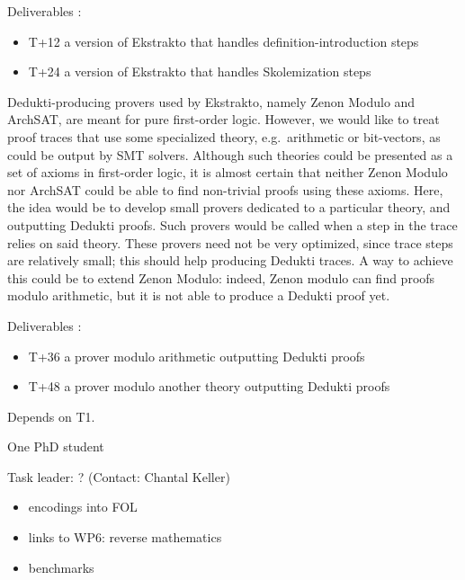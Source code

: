 \begin{workpackage}[id=atpetc,wphases=0-48,type=RTD,
  short=ATPs etc.,%
  title={ATP, SAT, SMT, Model checkers},
  lead=Lie,
  LieRM=10]
\begin{tasklist}
\begin{task}[id=tracetodedukti, title=Translate ATP traces into Dedukti]
\begin{compactenum}
  Deliverables :
  \begin{itemize}
  \item T+12 a version of Ekstrakto that handles definition-introduction steps
  \item T+24 a version of Ekstrakto that handles Skolemization steps
  \end{itemize}



\item  Dedukti-producing provers used by Ekstrakto, namely Zenon Modulo and
  ArchSAT, are meant for pure first-order logic. However, we would like
  to treat proof traces that use some specialized theory,
  e.g.\ arithmetic or bit-vectors, as could be output by SMT
  solvers. Although such theories could be presented as a set of axioms
  in first-order logic, it is almost certain that neither Zenon Modulo
  nor ArchSAT could be able to find non-trivial proofs using these
  axioms. Here, the idea would be to develop small provers dedicated to
  a particular theory, and outputting Dedukti proofs. Such provers would
  be called when a step in the trace relies on said theory. These
  provers need not be very optimized, since trace steps are relatively
  small; this should help producing Dedukti traces. A way to achieve
  this could be to extend Zenon Modulo: indeed, Zenon modulo can find
  proofs modulo arithmetic, but it is not able to produce a Dedukti
  proof yet.

  Deliverables :
  \begin{itemize}
  \item T+36 a prover modulo arithmetic outputting Dedukti proofs
  \item T+48 a prover modulo another theory outputting Dedukti proofs
  \end{itemize}

\end{compactenum}
  Depends on T1.

  One PhD student
  
\end{task}


\begin{task}[id=deduktitoatp, title=Translate Dedukti statements into ATPs inputs]
Task leader: ? (Contact: Chantal Keller)

\begin{itemize}
\item encodings into FOL
\item links to WP6: reverse mathematics
\item benchmarks
\end{itemize}


\end{task}
\end{tasklist}
\end{workpackage}
